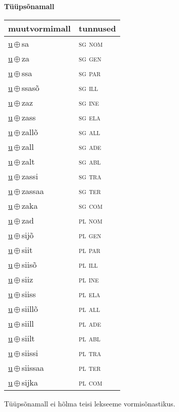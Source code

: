 

\vspace{3.5em}
\noindent \begin{minipage}{\textwidth}
\noindent \textbf{Tüüpsõnamall \,}\\

\begin{sideways}
\begin{tabular}{l l}
muutvormimall & tunnused \\
\hline
\underline{u}\,$\oplus$\,sa & \textsc{ sg nom } \\
\underline{u}\,$\oplus$\,za & \textsc{ sg gen } \\
\underline{u}\,$\oplus$\,ssa & \textsc{ sg par } \\
\underline{u}\,$\oplus$\,ssasõ & \textsc{ sg ill } \\
\underline{u}\,$\oplus$\,zaz & \textsc{ sg ine } \\
\underline{u}\,$\oplus$\,zass & \textsc{ sg ela } \\
\underline{u}\,$\oplus$\,zallõ & \textsc{ sg all } \\
\underline{u}\,$\oplus$\,zall & \textsc{ sg ade } \\
\underline{u}\,$\oplus$\,zalt & \textsc{ sg abl } \\
\underline{u}\,$\oplus$\,zassi & \textsc{ sg tra } \\
\underline{u}\,$\oplus$\,zassaa & \textsc{ sg ter } \\
\underline{u}\,$\oplus$\,zaka & \textsc{ sg com } \\
\underline{u}\,$\oplus$\,zad & \textsc{ pl nom } \\
\underline{u}\,$\oplus$\,sijõ & \textsc{ pl gen } \\
\underline{u}\,$\oplus$\,siit & \textsc{ pl par } \\
\underline{u}\,$\oplus$\,siisõ & \textsc{ pl ill } \\
\underline{u}\,$\oplus$\,siiz & \textsc{ pl ine } \\
\underline{u}\,$\oplus$\,siiss & \textsc{ pl ela } \\
\underline{u}\,$\oplus$\,siillõ & \textsc{ pl all } \\
\underline{u}\,$\oplus$\,siill & \textsc{ pl ade } \\
\underline{u}\,$\oplus$\,siilt & \textsc{ pl abl } \\
\underline{u}\,$\oplus$\,siissi & \textsc{ pl tra } \\
\underline{u}\,$\oplus$\,siissaa & \textsc{ pl ter } \\
\underline{u}\,$\oplus$\,sijka & \textsc{ pl com } \\
\end{tabular}
\end{sideways}
\label{tab:tüüpsõnamall-usa}

\end{minipage}

 
\vspace{1em}
\noindent Tüüpsõnamall  ei hõlma teisi lekseeme vormi\-sõnastikus.
